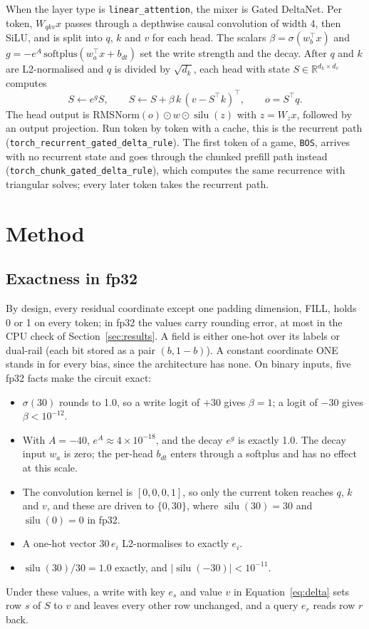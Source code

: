\documentclass[11pt]{article}
\newcommand{\tok}[1]{\texttt{#1}}
\newcommand{\silu}{\operatorname{silu}}
\begin{document}
When the layer type is \texttt{linear\_attention}, the mixer is Gated DeltaNet. Per token, $W_{qkv} x$ passes through a depthwise causal convolution of width 4, then SiLU, and is split into $q$, $k$ and $v$ for each head. The scalars $\beta = \sigma(w_b^\top x)$ and $g = -e^{A}\,\mathrm{softplus}(w_a^\top x + b_{dt})$ set the write strength and the decay. After $q$ and $k$ are L2-normalised and $q$ is divided by $\sqrt{d_k}$, each head with state $S \in \mathbb{R}^{d_k \times d_v}$ computes
\begin{equation}
S \leftarrow e^{g} S, \qquad S \leftarrow S + \beta\, k \,(v - S^\top k)^\top, \qquad o = S^\top q .
\label{eq:delta}
\end{equation}
The head output is $\mathrm{RMSNorm}(o) \odot w \odot \silu(z)$ with $z = W_z x$, followed by an output projection. Run token by token with a cache, this is the recurrent path (\texttt{torch\_recurrent\_gated\_delta\_rule}). The first token of a game, \tok{BOS}, arrives with no recurrent state and goes through the chunked prefill path instead (\texttt{torch\_chunk\_gated\_delta\_rule}), which computes the same recurrence with triangular solves; every later token takes the recurrent path.

\section{Method}
\label{sec:method}

\subsection{Exactness in fp32}
\label{sec:exact}

By design, every residual coordinate except one padding dimension, FILL, holds 0 or 1 on every token; in fp32 the values carry rounding error, at most \nPtwoResidualErr{} in the CPU check of Section~\ref{sec:results}. A field is either one-hot over its labels or dual-rail (each bit stored as a pair $(b, 1-b)$). A constant coordinate ONE stands in for every bias, since the architecture has none. On binary inputs, five fp32 facts make the circuit exact:
\begin{itemize}
\item $\sigma(30)$ rounds to 1.0, so a write logit of $+30$ gives $\beta = 1$; a logit of $-30$ gives $\beta < 10^{-12}$.
\item With $A = -40$, $e^{A} \approx 4\times 10^{-18}$, and the decay $e^{g}$ is exactly 1.0. The decay input $w_a$ is zero; the per-head $b_{dt}$ enters through a softplus and has no effect at this scale.
\item The convolution kernel is $[0, 0, 0, 1]$, so only the current token reaches $q$, $k$ and $v$, and these are driven to $\{0, 30\}$, where $\silu(30) = 30$ and $\silu(0) = 0$ in fp32.
\item A one-hot vector $30\,e_i$ L2-normalises to exactly $e_i$.
\item $\silu(30)/30 = 1.0$ exactly, and $|\silu(-30)| < 10^{-11}$.
\end{itemize}
Under these values, a write with key $e_s$ and value $v$ in Equation~\ref{eq:delta} sets row $s$ of $S$ to $v$ and leaves every other row unchanged, and a query $e_r$ reads row $r$ back.
\end{document}
